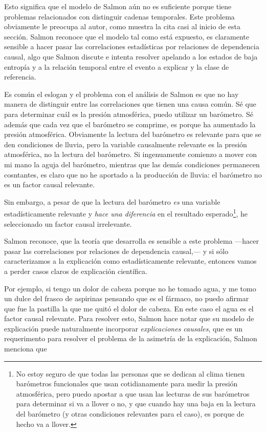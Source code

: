 Esto significa que el modelo de Salmon aún no es suficiente porque
tiene problemas relacionados con distinguir cadenas temporales. Este
problema obviamente le preocupa al autor, como muestra la cita casi
al inicio de esta sección. Salmon reconoce que el modelo tal como
está expuesto, es claramente sensible a hacer pasar las correlaciones
estadísticas por relaciones de dependencia causal, algo que Salmon
discute e intenta resolver apelando a los estados de baja entropía y
a la relación temporal entre el evento a explicar y la clase de
referencia.

Es común el eslogan  y el
problema con el análisis de Salmon es que no hay manera de distinguir
entre las correlaciones que tienen una causa común. Sé que para
determinar cuál es la presión atmosférica, puedo utilizar un
barómetro. Sé además que cada vez que el barómetro se comprime, es
porque ha aumentado la presión atmosférica. Obviamente la lectura del
barómetro es relevante para que se den condiciones de lluvia, pero la
variable causalmente relevante es la presión atmosférica, no la
lectura del barómetro. Si ingenuamente comienzo a mover con mi mano
la aguja del barómetro, mientras que las demás condiciones permanecen
cosntantes, es claro que no he aportado a la producción de lluvia: el
barómetro no es un factor causal relevante.

Sin embargo, a pesar de que la lectura del barómetro \emph{es} una
variable estadísticamente relevante y \emph{hace una diferencia} en
el resultado esperado\footnote{ No estoy seguro de que todas las
 personas que se dedican al clima tienen barómetros funcionales que
 usan cotidianamente para medir la presión atmosférica, pero puedo
 apostar a que usan las lecturas de sus barómetros para determinar si
 va a llover o no, y que cuando hay una baja en la lectura del
 barómetro (y otras condiciones relevantes para el caso), es porque de
 hecho va a llover. }, he seleccionado un factor causal irrelevante.

Salmon reconoce, que la teoría que desarrolla es sensible a este
problema ---hacer pasar las correlaciones por relaciones de
dependencia causal,--- y si sólo caracterizamos a la explicación como
estadísticamente relevante, entonces vamos a perder casos claros de
explicación científica.

Por ejemplo, si tengo un dolor de cabeza porque no he tomado agua, y
me tomo un dulce del frasco de aspirinas pensando que es el fármaco,
no puedo afirmar que fue la pastilla la que me quitó el dolor de
cabeza. En este caso el agua es el factor causal relevante. Para
resolver esto, Salmon hace notar que su modelo de explicación puede
naturalmente incorporar \emph {explicaciones causales}, que es un
requerimento para resolver el problema de la asimetría de la
explicación, Salmon menciona que

